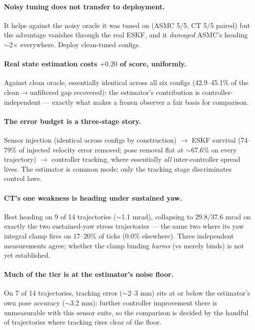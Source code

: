 \documentclass[11pt]{article}
\begin{document}
\paragraph{Noisy tuning does not transfer to deployment.} It helps against the noisy
oracle it was tuned on (ASMC 5/5, CT 5/5 paired) but the advantage vanishes through the
real ESKF, and it \emph{damaged} ASMC's heading $\sim$2$\times$ everywhere. Deploy
clean-tuned configs.

\paragraph{Real state estimation costs $+0.20$ of score, uniformly.} Against clean
oracle, essentially identical across all six configs (42.9--45.1\% of the
clean$\to$unfiltered gap recovered): the estimator's contribution is
controller-independent --- exactly what makes a frozen observer a fair basis for
comparison.

\paragraph{The error budget is a three-stage story.} Sensor injection (identical across
configs by construction) $\to$ ESKF survival (74--79\% of injected velocity error
removed; pose removal flat at $\sim$67.6\% on every trajectory) $\to$ controller
tracking, where essentially \emph{all} inter-controller spread lives. The estimator is
common mode; only the tracking stage discriminates control laws.

\paragraph{CT's one weakness is heading under sustained yaw.} Best heading on 9 of 14
trajectories ($\sim$1.1 mrad), collapsing to 29.8/37.6 mrad on exactly the two
sustained-yaw stress trajectories --- the same two where its yaw integral clamp fires on
17--20\% of ticks (0.0\% elsewhere). Three independent measurements agree; whether the
clamp binding \emph{harms} (vs merely binds) is not yet established.

\paragraph{Much of the tier is at the estimator's noise floor.} On 7 of 14 trajectories,
tracking error ($\sim$2--3 mm) sits at or below the estimator's own pose accuracy
($\sim$3.2 mm): further controller improvement there is unmeasurable with this sensor
suite, so the comparison is decided by the handful of trajectories where tracking rises
clear of the floor.
\end{document}
